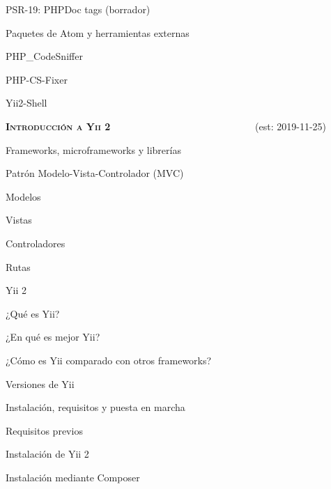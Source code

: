 \begin{longenum}
\begin{longenum}
\begin{longenum}
            \item PSR-19: PHPDoc tags (borrador)
        \end{longenum}
        \item Paquetes de Atom y herramientas externas \opcional\
        \begin{longenum}
            \item PHP\_CodeSniffer
            \item PHP-CS-Fixer
            \item Yii2-Shell
        \end{longenum}
    \end{longenum}
    \item \textbf{\textsc{Introducción a Yii 2}} \ \ \ \ \ \ \ \ \ \ \ \ \ \ \ \ \ \ \ \ \ \ \ \ \ \ \ \ \ (est: \mbox{2019-11-25})
    \begin{longenum}
        \item Frameworks, microframeworks y librerías
        \item Patrón Modelo-Vista-Controlador (MVC)
        \begin{longenum}
            \item Modelos
            \item Vistas
            \item Controladores
            \item Rutas
        \end{longenum}
        \item Yii 2
        \begin{longenum}
            \item ¿Qué es Yii?
            \item ¿En qué es mejor Yii?
            \item ¿Cómo es Yii comparado con otros frameworks?
            \item Versiones de Yii
        \end{longenum}
        \item Instalación, requisitos y puesta en marcha
        \begin{longenum}
            \item Requisitos previos
            \item Instalación de Yii 2
            \begin{longenum}
                \item Instalación mediante Composer

\end{longenum}
\end{longenum}
\end{longenum}
\end{longenum}
